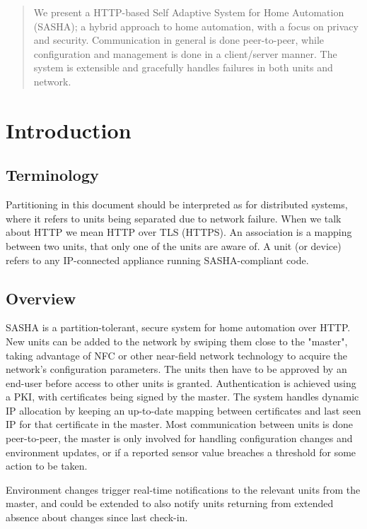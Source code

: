 \begin{abstract}

We present a HTTP-based Self Adaptive System for Home Automation (SASHA); a hybrid approach to home automation, with a focus on privacy and security. Communication in general is done peer-to-peer, while configuration and management is done in a client/server manner. The system is extensible and gracefully handles failures in both units and network.

\end{abstract}


\section{Introduction}

\subsection{Terminology}
Partitioning in this document should be interpreted as for distributed systems, where it refers to units being separated due to network failure. When we talk about HTTP we mean HTTP over TLS (HTTPS). An association is a mapping between two units, that only one of the units are aware of. A unit (or device) refers to any IP-connected appliance running SASHA-compliant code.

\subsection{Overview}
SASHA is a partition-tolerant, secure system for home automation over HTTP. New units can be added to the network by swiping them close to the "master", taking advantage of NFC or other near-field network technology to acquire the network's configuration parameters. The units then have to be approved by an end-user before access to other units is granted. Authentication is achieved using a PKI, with certificates being signed by the master. The system handles dynamic IP allocation by keeping an up-to-date mapping between certificates and last seen IP for that certificate in the master. Most communication between units is done peer-to-peer, the master is only involved for handling configuration changes and environment updates, or if a reported sensor value breaches a threshold for some action to be taken.

Environment changes trigger real-time notifications to the relevant units from the master, and could be extended to also notify units returning from extended absence about changes since last check-in.


